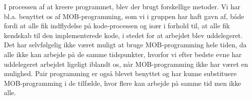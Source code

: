 \noindent
I processen af at kreere programmet, blev der brugt forskellige metoder. Vi har bl.a. benyttet os af MOB-programming, som vi i gruppen har haft gavn af, både fordi at alle fik indflydelse på kode-processen og især i forhold til, at alle fik kendskab til den implementerede kode, i stedet for at arbejdet blev uddelegeret. Det har selvfølgelig ikke været muligt at bruge MOB-programming hele tiden, da alle ikke kan arbejde på de samme tidspunkter, hvorfor vi efter bedste evne har uddelegeret arbejdet ligeligt iblandt os, når MOB-programming ikke har været en mulighed. Pair programming er også blevet benyttet og har kunne substituere MOB-programming i de tilfælde, hvor flere kan arbejde på samme tid men ikke alle.